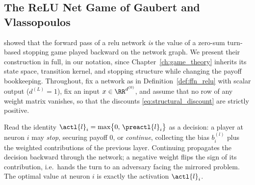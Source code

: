 \subsection{The ReLU Net Game of Gaubert and Vlassopoulos}\label{subsec:relu_net_game}

\textcite{Gaubert2025} showed that the forward pass of a \ac{relu} network \emph{is} the value of a zero-sum turn-based stopping game played backward on the network graph. We present their construction in full, in our notation, since Chapter~\ref{ch:game_theory} inherits its state space, transition kernel, and stopping structure while changing the payoff bookkeeping. Throughout, fix a network as in Definition~\ref{def:ffn_relu} with scalar output ($d^{(L)} = 1$), fix an input $x \in \RR^{d^{(0)}}$, and assume that no row of any weight matrix vanishes, so that the discounts \eqref{eq:structural_discount} are strictly positive.

Read the identity $\actl{l}_i = \max\bigl\{0,\, \preactl{l}_i\bigr\}$ as a decision: a player at neuron $i$ may \emph{stop}, securing payoff $0$, or \emph{continue}, collecting the bias $b^{(l)}_i$ plus the weighted contributions of the previous layer. Continuing propagates the decision backward through the network; a negative weight flips the sign of its contribution, i.e.\ hands the turn to an adversary facing the mirrored problem. The optimal value at neuron $i$ is exactly the activation $\actl{l}_i$.

